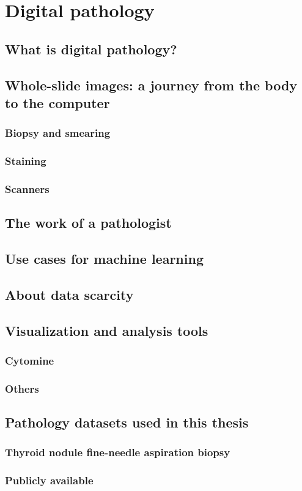 \chapter{Digital pathology}
\label{chap:backdp}

\section{What is digital pathology?}

\section{Whole-slide images: a journey from the body to the computer}

\subsection{Biopsy and smearing}
\subsection{Staining}
\subsection{Scanners}

\section{The work of a pathologist}

\section{Use cases for machine learning}

\section{About data scarcity}

\section{Visualization and analysis tools}

\subsection{Cytomine}

\subsection{Others}

\section{Pathology datasets used in this thesis}



\subsection{Thyroid nodule fine-needle aspiration biopsy}



\subsection{Publicly available}